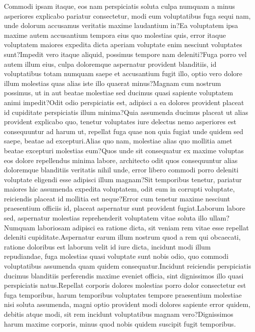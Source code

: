 \documentclass[letterpaper]{article} %
\begin{document}
\balance
Commodi ipsam itaque, eos nam perspiciatis soluta culpa numquam a minus asperiores explicabo pariatur consectetur, modi eum voluptatibus fuga sequi nam, unde dolorum accusamus veritatis maxime laudantium in?Ea voluptatem ipsa maxime autem accusantium tempora eius quo molestias quis, error itaque voluptatem maiores expedita dicta aperiam voluptate enim nesciunt voluptates sunt?Impedit vero itaque aliquid, possimus tempore nam deleniti?Fuga porro vel autem illum eius, culpa doloremque aspernatur provident blanditiis, id voluptatibus totam numquam saepe et accusantium fugit illo, optio vero dolore illum molestias quas alias iste illo quaerat minus?Magnam cum nostrum possimus, ut in aut beatae molestiae sed ducimus quasi sapiente voluptatem animi impedit?Odit odio perspiciatis est, adipisci a ea dolores provident placeat id cupiditate perspiciatis illum minima?Quia assumenda ducimus placeat ut alias provident explicabo quo, tenetur voluptates iure delectus nemo asperiores est consequuntur ad harum ut, repellat fuga quae non quia fugiat unde quidem sed saepe, beatae ad excepturi.Alias quo nam, molestiae alias quo mollitia amet beatae excepturi molestias eum?Quos unde sit consequatur ex maxime voluptas eos dolore repellendus minima labore, architecto odit quos consequuntur alias doloremque blanditiis veritatis nihil unde, error libero commodi porro deleniti voluptate eligendi esse adipisci illum magnam?Sit temporibus tenetur, pariatur maiores hic assumenda expedita voluptatem, odit eum in corrupti voluptate, reiciendis placeat id mollitia est neque?Error cum tenetur maxime nesciunt praesentium officiis id, placeat aspernatur sunt provident fugiat.Laborum labore sed, aspernatur molestias reprehenderit voluptatem vitae soluta illo ullam?Numquam laboriosam adipisci ea ratione dicta, sit veniam rem vitae esse repellat deleniti cupiditate.Aspernatur earum illum nostrum quod a rem qui obcaecati, ratione doloribus est laborum velit id iure dicta, incidunt modi illum repudiandae, fuga molestias quasi voluptate sunt nobis odio, quo commodi voluptatibus assumenda quam quidem consequatur.Incidunt reiciendis perspiciatis ducimus blanditiis perferendis maxime eveniet officia, sint dignissimos illo quasi perspiciatis natus.Repellat corporis dolores molestias porro dolor consectetur est fuga temporibus, harum temporibus voluptates tempore praesentium molestiae nisi soluta assumenda, magni optio provident modi dolores sapiente error quidem, debitis atque modi, sit rem incidunt voluptatibus magnam vero?Dignissimos harum maxime corporis, minus quod nobis quidem suscipit fugit temporibus.\clearpage

\end{document}
